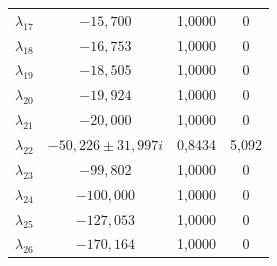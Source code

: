 \begin{longtable}{>{\centering\arraybackslash}m{1.5cm} c c c}
	$\lambda_{17}$ & $-15{,}700$                 & 1,0000 & 0 \\
	$\lambda_{18}$ & $-16{,}753$                 & 1,0000 & 0 \\
	$\lambda_{19}$ & $-18{,}505$                 & 1,0000 & 0 \\
	$\lambda_{20}$ & $-19{,}924$                 & 1,0000 & 0 \\
	$\lambda_{21}$ & $-20{,}000$                 & 1,0000 & 0 \\
	$\lambda_{22}$ & $-50{,}226 \pm 31{,}997i$   & 0,8434 & 5,092 \\
	$\lambda_{23}$ & $-99{,}802$                 & 1,0000 & 0 \\
	$\lambda_{24}$ & $-100{,}000$                & 1,0000 & 0 \\
	$\lambda_{25}$ & $-127{,}053$                & 1,0000 & 0 \\
	$\lambda_{26}$ & $-170{,}164$                & 1,0000 & 0 \\
\end{longtable}
\par
\endgroup

